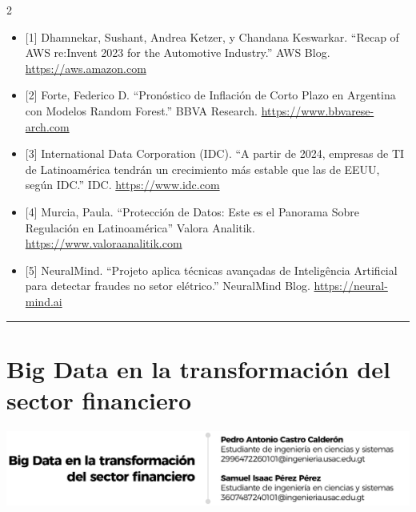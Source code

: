 \documentclass[12pt,spanish,Letterpaper,openany]{book}
\newcommand{\HRule}{\begin{center}\rule{0.5\linewidth}{0.2mm}\end{center}}
\begin{document}
\begin {multicols}{2}
\begin{itemize}
\item
  {[}1{]} Dhamnekar, Sushant, Andrea Ketzer, y Chandana Keswarkar. ``Recap of AWS re:Invent 2023 for the Automotive Industry.'' AWS Blog. \href{https://aws.amazon.com/es/blogs/industries/recap-of-aws-reinvent-2023-for-the-automotive-and-manufacturing-industry/}{https://aws.amazon.com}
\item
  {[}2{]} Forte, Federico D. ``Pronóstico de Inflación de Corto Plazo en Argentina con Modelos Random Forest.'' BBVA
  Research. \href{https://www.bbvaresearch.com/publicaciones/pronostico-de-inflacion-de-corto-plazo-en-argentina-con-modelos-random-forest/}{https://www.bbvarese-
  arch.com}
\item
  {[}3{]} International Data Corporation (IDC). ``A partir de 2024, empresas de TI de Latinoamérica tendrán un crecimiento
  más estable que las de EEUU, según IDC.'' IDC. \href{https://www.idc.com/getdoc.jsp?containerId=prLA51751624}{https://www.idc.com}
\item
  {[}4{]} Murcia, Paula. ``Protección de Datos: Este es el Panorama Sobre Regulación en Latinoamérica'' Valora Analitik. \href{https://www.valoraanalitik.com/proteccion-de-datos-este-es-el-panorama-sobre-regulacion-en-latinoamerica/}{https://www.valoraanalitik.com}
\item
  {[}5{]} NeuralMind. ``Projeto aplica técnicas avançadas de Inteligência Artificial para detectar fraudes no setor elétrico.'' NeuralMind Blog. \href{https://neuralmind.ai/blog/projeto-aplica-tecnicas-avancadas-de-inteligencia-artificial-para-detectar-fraudes-no-setor-eletrico/}{https://neural-
  mind.ai}
\end{itemize}

\end {multicols}

\medskip

\HRule

\medskip

\hypertarget{pareja19}{%
\chapter{Big Data en la transformación del sector financiero}\label{pareja19}}

\begin{center}\includegraphics[width=1\linewidth]{autores/pareja19_01} \end{center}
\end{document}
